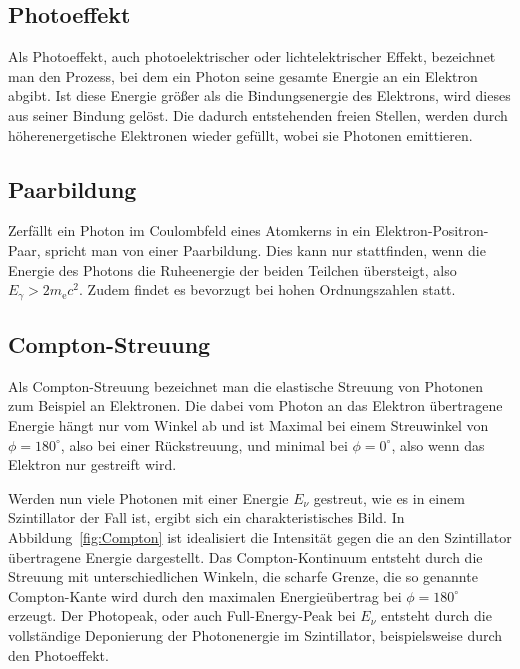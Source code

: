 \subsection{Photoeffekt}

Als Photoeffekt, auch photoelektrischer oder lichtelektrischer Effekt,
bezeichnet man den Prozess, bei dem ein Photon seine gesamte Energie an ein
Elektron abgibt. Ist diese Energie größer als die Bindungsenergie des
Elektrons, wird dieses aus seiner Bindung gelöst. Die dadurch entstehenden
freien Stellen, werden durch höherenergetische Elektronen wieder gefüllt, wobei
sie Photonen emittieren.

\subsection{Paarbildung}

Zerfällt ein Photon im Coulombfeld eines Atomkerns in ein
Elektron-Positron-Paar, spricht man von einer Paarbildung. Dies kann nur
stattfinden, wenn die Energie des Photons die Ruheenergie der beiden Teilchen
übersteigt, also $E_\gamma > 2m_\mathrm{e}c^2$. Zudem findet es bevorzugt bei
hohen Ordnungszahlen statt.

\subsection{Compton-Streuung}

Als Compton-Streuung bezeichnet man die elastische Streuung von Photonen zum
Beispiel an Elektronen. Die dabei vom Photon an das Elektron übertragene
Energie hängt nur vom Winkel ab und ist Maximal bei einem Streuwinkel von $\phi
= 180^\circ$, also bei einer Rückstreuung, und minimal bei $\phi = 0^\circ$,
also wenn das Elektron nur gestreift wird.

Werden nun viele Photonen mit einer Energie $E_\nu$ gestreut, wie es in einem
Szintillator der Fall ist, ergibt sich ein charakteristisches Bild.
In Abbildung~\ref{fig:Compton} ist idealisiert die Intensität gegen
die an den Szintillator übertragene Energie dargestellt. Das
Compton-Kontinuum entsteht durch die Streuung mit unterschiedlichen Winkeln,
die scharfe Grenze, die so genannte Compton-Kante wird durch den maximalen
Energieübertrag bei $\phi = 180^\circ$ erzeugt. Der Photopeak, oder auch
Full-Energy-Peak bei $E_\nu$ entsteht durch die vollständige Deponierung der
Photonenergie im Szintillator, beispielsweise durch den Photoeffekt.

